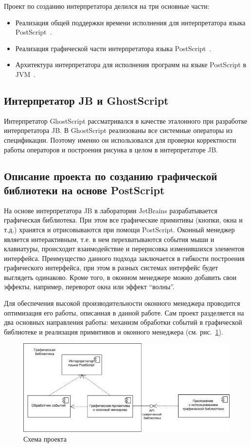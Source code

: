 	Проект по созданию интерпретатора делился на три основные части:
	\begin{itemize}
		\item Реализация общей поддержки времени исполнения для интерпретатора языка PostScript~\cite{runtime}.
		\item Реализация графической части интерпретатора языка PostScript~\cite{graphic}.
		\item Архитектура интерпретатора для исполнения программ на языке PostScript в JVM~\cite{architecture}.
	\end{itemize}

		
	 
	\subsection{Интерпретатор JB и GhostScript}
	Интерпретатор GhostScript рассматривался в качестве эталонного при разработке интерпретатора JB. В GhostScript реализованы все системные операторы из спецификации. Поэтому именно он использовался для проверки корректности работы операторов и построения рисунка в целом в интерпретаторе JB.
		
	
	\subsection{Описание проекта по созданию графической \\ библиотеки на основе PostScript}	
	На основе интерпретатора JB  в лаборатории JetBrains разрабатывается графическая библиотека. При этом все графические примитивы (кнопки, окна и т.д.) хранятся и отрисовываются при помощи PostScript. Оконный менеджер является интерактивным, т.е. в нем перехватываются события мыши и клавиатуры, происходит взаимодействие и перерисовка изменившихся элементов интерфейса.  Преимущество данного подхода заключается в гибкости построения графического интерфейса, при этом в разных системах интерфейс будет выглядеть одинаково. Кроме того, в оконном менеджере можно добавить свои эффекты, например, переворот окна или эффект ``волны''.
	
	Для обеспечения высокой производительности оконного менеджера проводится оптимизация его работы, описанная в данной работе. Сам проект разделяется на два основных направления работы: механизм обработки событий в графической библиотеке и реализация примитивов и оконного менеджера (см. рис.~\ref{project_scheme}). 
	
	\begin{figure} [h]
			\includegraphics[width=\linewidth]{Pozdin/Project_scheme.png}
			\caption{Схема проекта}\label{project_scheme}
	\end{figure}

